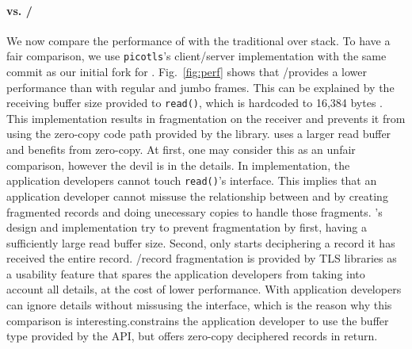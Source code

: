 \paragraph*{\tcpls vs. \tls/\tcp}
We now compare the performance of \tcpls with the traditional \tls over \tcp stack. To have a fair comparison, we use \texttt{picotls}'s client/server
implementation with the same commit as our initial fork for \tcpls.
Fig.~\ref{fig:perf} shows that \tls/\tcp provides a lower performance than
\tcpls with regular and jumbo frames. This can be explained by the receiving
buffer size provided to \texttt{read()}, which is hardcoded to 16,384 bytes
. This implementation results in fragmentation on the
receiver and prevents it from using the zero-copy code path provided by the
library. \tcpls uses a larger read buffer and benefits from zero-copy. At first, one may consider this as an unfair comparison, however the devil is in the details. In \tcpls implementation, the application developers cannot touch \texttt{read()}'s interface. This implies that an application developer cannot missuse the relationship between \tls and \tcp by creating fragmented records and doing unecessary copies to handle those fragments. \tcpls's design and implementation try to prevent fragmentation by first, having a sufficiently large read buffer size. Second, \tcpls only starts deciphering a record it has received the entire record. \tls/\tcp record fragmentation is provided by TLS libraries as a usability feature that spares the application developers from taking into account all \tls details, at the cost of lower performance.
With \tcpls application developers can ignore \tls details without missusing the interface, which is the reason why this comparison is interesting.\tcpls constrains the application developer to use the buffer type provided
by the API, but offers zero-copy deciphered records in return.


